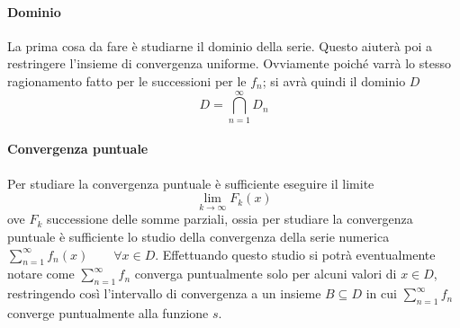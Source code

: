 \documentclass[a4paper,12pt]{article}
\begin{document}
\paragraph*{Dominio}
La prima cosa da fare è studiarne il dominio della serie. Questo aiuterà poi a restringere l'insieme di convergenza uniforme. Ovviamente poiché varrà lo stesso ragionamento fatto per le successioni per le $f_n$; si avrà quindi il dominio $D$
$$D=\displaystyle\bigcap_{n=1}^{\infty} D_n$$
\paragraph*{Convergenza puntuale}
Per studiare la convergenza puntuale è sufficiente eseguire il limite
$$\lim_{k\to\infty} F_k(x)$$
ove $F_k$ successione delle somme parziali, ossia per studiare la convergenza puntuale è sufficiente lo studio della convergenza della serie numerica $\sum_{n=1}^{\infty}f_n(x) \qquad \forall x \in D$.
Effettuando questo studio si potrà eventualmente notare come $\sum_{n=1}^{\infty}f_n$ converga puntualmente solo per alcuni valori di $x\in D$, restringendo così l'intervallo di convergenza a un insieme $B\subseteq D$ in cui $\sum_{n=1}^{\infty}f_n$ converge puntualmente alla funzione $s$.
\end{document}
